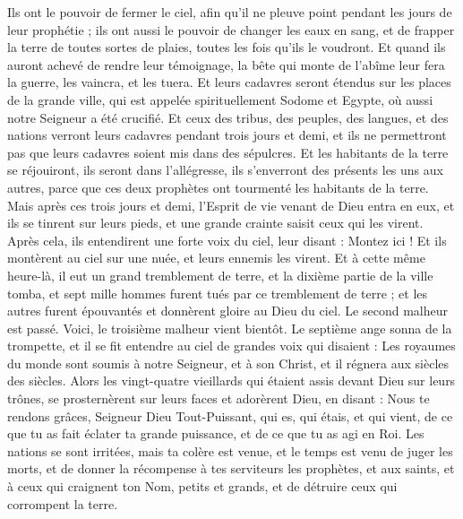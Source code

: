 \begin{multicols}{2}
Ils ont le pouvoir de fermer le ciel, afin qu'il ne pleuve point pendant les jours de leur prophétie ; ils ont aussi le pouvoir de changer les eaux en sang, et de frapper la terre de toutes sortes de plaies, toutes les fois qu'ils le voudront.
Et quand ils auront achevé de rendre leur témoignage, la bête qui monte de l'abîme leur fera la guerre, les vaincra, et les tuera.
Et leurs cadavres seront étendus sur les places de la grande ville, qui est appelée spirituellement Sodome et Egypte, où aussi notre Seigneur a été crucifié.
Et ceux des tribus, des peuples, des langues, et des nations verront leurs cadavres pendant trois jours et demi, et ils ne permettront pas que leurs cadavres soient mis dans des sépulcres.
Et les habitants de la terre se réjouiront, ils seront dans l'allégresse, ils s'enverront des présents les uns aux autres, parce que ces deux prophètes ont tourmenté les habitants de la terre.
Mais après ces trois jours et demi, l'Esprit de vie venant de Dieu entra en eux, et ils se tinrent sur leurs pieds, et une grande crainte saisit ceux qui les virent.
Après cela, ils entendirent une forte voix du ciel, leur disant : Montez ici ! Et ils montèrent au ciel sur une nuée, et leurs ennemis les virent.
Et à cette même heure-là, il eut un grand tremblement de terre, et la dixième partie de la ville tomba, et sept mille hommes furent tués par ce tremblement de terre ; et les autres furent épouvantés et donnèrent gloire au Dieu du ciel.
Le second malheur est passé. Voici, le troisième malheur vient bientôt.
Le septième ange sonna de la trompette, et il se fit entendre au ciel de grandes voix qui disaient : Les royaumes du monde sont soumis à notre Seigneur, et à son Christ, et il régnera aux siècles des siècles.
Alors les vingt-quatre vieillards qui étaient assis devant Dieu sur leurs trônes, se prosternèrent sur leurs faces et adorèrent Dieu,
en disant : Nous te rendons grâces, Seigneur Dieu Tout-Puissant, qui es, qui étais, et qui vient, de ce que tu as fait éclater ta grande puissance, et de ce que tu as agi en Roi.
Les nations se sont irritées, mais ta colère est venue, et le temps est venu de juger les morts, et de donner la récompense à tes serviteurs les prophètes, et aux saints, et à ceux qui craignent ton Nom, petits et grands, et de détruire ceux qui corrompent la terre.

\end{multicols}
